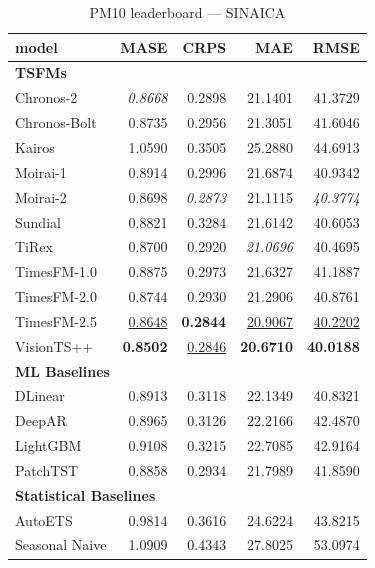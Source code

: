 \begin{table}[H]
\caption{PM10 leaderboard --- SINAICA}
\centering
\begin{small}
\begin{tabular}{lrrrr}
\toprule
model & MASE & CRPS & MAE & RMSE \\
\midrule
\multicolumn{5}{l}{\textbf{TSFMs}} \\
Chronos-2 & \textit{0.8668} & 0.2898 & 21.1401 & 41.3729 \\
Chronos-Bolt & 0.8735 & 0.2956 & 21.3051 & 41.6046 \\
Kairos & 1.0590 & 0.3505 & 25.2880 & 44.6913 \\
Moirai-1 & 0.8914 & 0.2996 & 21.6874 & 40.9342 \\
Moirai-2 & 0.8698 & \textit{0.2873} & 21.1115 & \textit{40.3774} \\
Sundial & 0.8821 & 0.3284 & 21.6142 & 40.6053 \\
TiRex & 0.8700 & 0.2920 & \textit{21.0696} & 40.4695 \\
TimesFM-1.0 & 0.8875 & 0.2973 & 21.6327 & 41.1887 \\
TimesFM-2.0 & 0.8744 & 0.2930 & 21.2906 & 40.8761 \\
TimesFM-2.5 & \underline{0.8648} & \textbf{0.2844} & \underline{20.9067} & \underline{40.2202} \\
VisionTS++ & \textbf{0.8502} & \underline{0.2846} & \textbf{20.6710} & \textbf{40.0188} \\
\midrule
\multicolumn{5}{l}{\textbf{ML Baselines}} \\
DLinear & 0.8913 & 0.3118 & 22.1349 & 40.8321 \\
DeepAR & 0.8965 & 0.3126 & 22.2166 & 42.4870 \\
LightGBM & 0.9108 & 0.3215 & 22.7085 & 42.9164 \\
PatchTST & 0.8858 & 0.2934 & 21.7989 & 41.8590 \\
\midrule
\multicolumn{5}{l}{\textbf{Statistical Baselines}} \\
AutoETS & 0.9814 & 0.3616 & 24.6224 & 43.8215 \\
Seasonal Naive & 1.0909 & 0.4343 & 27.8025 & 53.0974 \\
\bottomrule
\end{tabular}
\end{small}
\end{table}